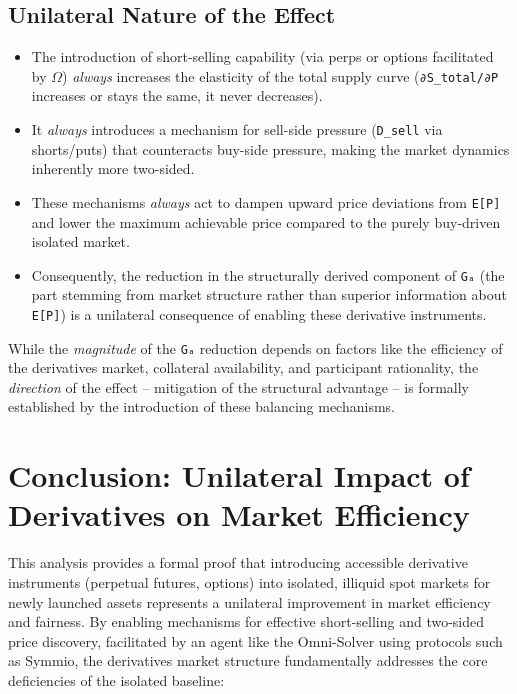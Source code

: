 \documentclass{article}
\begin{document}
\subsection{Unilateral Nature of the Effect}
\begin{itemize}
    \item The introduction of short-selling capability (via perps or options facilitated by $\Omega$) \textit{always} increases the elasticity of the total supply curve (\lstinline{∂S_total/∂P} increases or stays the same, it never decreases).
    \item It \textit{always} introduces a mechanism for sell-side pressure (\lstinline{D_sell} via shorts/puts) that counteracts buy-side pressure, making the market dynamics inherently more two-sided.
    \item These mechanisms \textit{always} act to dampen upward price deviations from \lstinline{E[P]} and lower the maximum achievable price compared to the purely buy-driven isolated market.
    \item Consequently, the reduction in the structurally derived component of \lstinline{Gₐ} (the part stemming from market structure rather than superior information about \lstinline{E[P]}) is a unilateral consequence of enabling these derivative instruments.
\end{itemize}
While the \textit{magnitude} of the \lstinline{Gₐ} reduction depends on factors like the efficiency of the derivatives market, collateral availability, and participant rationality, the \textit{direction} of the effect – mitigation of the structural advantage – is formally established by the introduction of these balancing mechanisms.

\section{Conclusion: Unilateral Impact of Derivatives on Market Efficiency}

This analysis provides a formal proof that introducing accessible derivative instruments (perpetual futures, options) into isolated, illiquid spot markets for newly launched assets represents a unilateral improvement in market efficiency and fairness. By enabling mechanisms for effective short-selling and two-sided price discovery, facilitated by an agent like the Omni-Solver using protocols such as Symmio, the derivatives market structure fundamentally addresses the core deficiencies of the isolated baseline:
\end{document}
